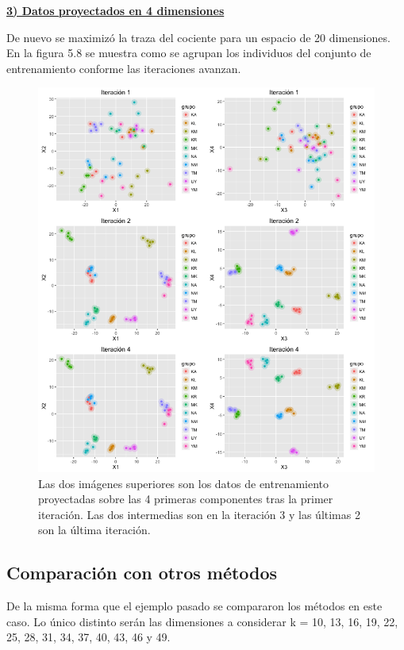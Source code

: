 \underline{\textbf{3) Datos proyectados en 4 dimensiones}}

De nuevo se maximizó la traza del cociente para un espacio de 20 dimensiones. En la figura 5.8 se muestra como se agrupan los individuos del conjunto de entrenamiento conforme las iteraciones avanzan.

\begin{figure}[!ht]
  \centering
  \includegraphics[width=1\textwidth]{Figures/Chapter4_ejemplo20componentes_JAF.png} 
  \caption[Ejemplo de proyección en 20 dimensiones (MNIST)]
  {Las dos imágenes superiores son los datos de entrenamiento proyectadas sobre las 4 primeras componentes tras la primer iteración. Las dos intermedias son en la iteración 3 y las últimas 2 son la última iteración.}
\end{figure}


\subsection{Comparación con otros métodos}

De la misma forma que el ejemplo pasado se compararon los métodos en este caso. Lo único distinto serán las dimensiones a considerar k = 10, 13, 16, 19, 22, 25, 28, 31, 34, 37, 40, 43, 46 y 49. 

